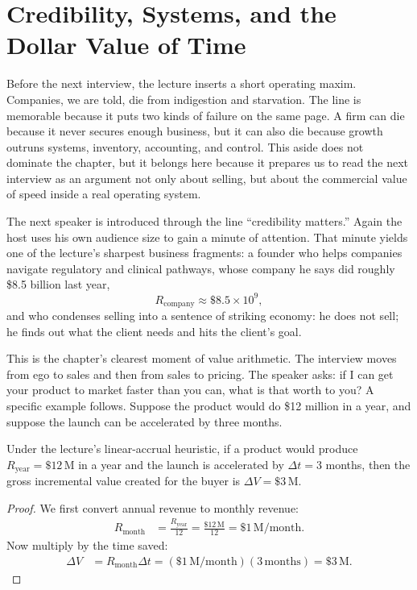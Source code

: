 \section{Credibility, Systems, and the Dollar Value of Time}

Before the next interview, the lecture inserts a short operating maxim. Companies, we are told, die from indigestion and starvation. The line is memorable because it puts two kinds of failure on the same page. A firm can die because it never secures enough business, but it can also die because growth outruns systems, inventory, accounting, and control. This aside does not dominate the chapter, but it belongs here because it prepares us to read the next interview as an argument not only about selling, but about the commercial value of speed inside a real operating system.

The next speaker is introduced through the line ``credibility matters.'' Again the host uses his own audience size to gain a minute of attention. That minute yields one of the lecture's sharpest business fragments: a founder who helps companies navigate regulatory and clinical pathways, whose company he says did roughly \$8.5 billion last year,
\begin{equation}
R_{\mathrm{company}} \approx \$8.5\times 10^{9},
\end{equation}
and who condenses selling into a sentence of striking economy: he does not sell; he finds out what the client needs and hits the client's goal.

This is the chapter's clearest moment of value arithmetic. The interview moves from ego to sales and then from sales to pricing. The speaker asks: if I can get your product to market faster than you can, what is that worth to you? A specific example follows. Suppose the product would do \$12 million in a year, and suppose the launch can be accelerated by three months.

\begin{proposition}
Under the lecture's linear-accrual heuristic, if a product would produce \(R_{\mathrm{year}} = \$12\,\mathrm{M}\) in a year and the launch is accelerated by \(\Delta t = 3\) months, then the gross incremental value created for the buyer is \(\Delta V = \$3\,\mathrm{M}\).
\end{proposition}

\begin{proof}
We first convert annual revenue to monthly revenue:
\begin{align}
R_{\mathrm{month}}
&= \frac{R_{\mathrm{year}}}{12}
= \frac{\$12\,\mathrm{M}}{12}
= \$1\,\mathrm{M/month}.
\end{align}
Now multiply by the time saved:
\begin{align}
\Delta V
&= R_{\mathrm{month}} \Delta t
= (\$1\,\mathrm{M/month})(3\,\mathrm{months})
= \$3\,\mathrm{M}.
\end{align}
\end{proof}

